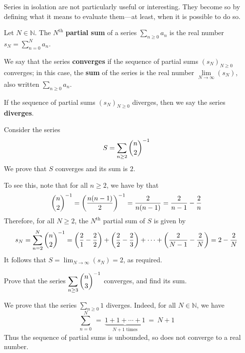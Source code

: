 Series in isolation are not particularly useful or interesting. They become so by defining what it means to evaluate them---at least, when it is possible to do so.

\begin{definition}
\label{defSumPartialSum}
Let $N \in \mathbb{N}$. The $N^{\text{th}}$ \textbf{partial sum} of a series $\displaystyle \sum_{n \ge 0} a_n$ is the real number $s_N = \displaystyle \sum_{n=0}^N a_n$.

We say that the series \textbf{converges} if the sequence of partial sums $(s_N)_{N \ge 0}$ converges; in this case, the \textbf{sum} of the series is the real number $\lim\limits_{N \to \infty} (s_N)$, also written $\displaystyle \sum_{n \ge 0} a_n$.

If the sequence of partial sums $(s_N)_{N \ge 0}$ diverges, then we say the series \textbf{diverges}.
\end{definition}

\begin{example}
Consider the series
\[ S = \sum_{n \ge 2} \dbinom{n}{2}^{-1} \]
We prove that $S$ converges and its sum is $2$.

To see this, note that for all $n \ge 2$, we have by  that
\[ \dbinom{n}{2}^{-1} = \left( \dfrac{n(n-1)}{2} \right)^{-1} = \dfrac{2}{n(n-1)} = \dfrac{2}{n-1} - \dfrac{2}{n} \]
Therefore, for all $N \ge 2$, the $N^{\text{th}}$ partial sum of $S$ is given by
\[ s_N = \sum_{n=2}^N \dbinom{n}{2}^{-1} = \left( \dfrac{2}{1} - \dfrac{2}{2} \right) + \left( \dfrac{2}{2} - \dfrac{2}{3} \right) + \cdots + \left( \dfrac{2}{N-1} - \dfrac{2}{N} \right) = 2 - \dfrac{2}{N} \]
It follows that $S = \displaystyle \lim_{N \to \infty} (s_N) = 2$, as required.
\end{example}

\begin{exercise}
Prove that the series $\displaystyle \sum_{n \ge 3} \dbinom{n}{3}^{-1}$ converges, and find its sum.
\end{exercise}

\begin{example}
\label{exConstantSeriesOfOneDiverges}
We prove that the series $\displaystyle \sum_{n \ge 0} 1$ diverges. Indeed, for all $N \in \mathbb{N}$, we have
\[ \sum_{n=0}^N ~=~ \underbrace{1 + 1 + \cdots + 1}_{N+1 \text{ times}} ~=~ N+1 \]
Thus the sequence of partial sums is unbounded, so does not converge to a real number.
\end{example}

